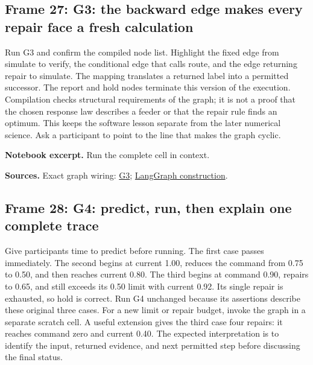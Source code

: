 \documentclass[11pt]{article}
\begin{document}
\subsection*{Frame 27: G3: the backward edge makes every repair face a fresh calculation}
Run G3 and confirm the compiled node list. Highlight the fixed edge from simulate to verify, the conditional edge that calls route, and the edge returning repair to simulate. The mapping translates a returned label into a permitted successor. The report and hold nodes terminate this version of the execution. Compilation checks structural requirements of the graph; it is not a proof that the chosen response law describes a feeder or that the repair rule finds an optimum. This keeps the software lesson separate from the later numerical science. Ask a participant to point to the line that makes the graph cyclic.\par
\par\noindent\begin{minipage}{\linewidth}\textbf{Notebook excerpt.} Run the complete cell in context.\par \end{minipage}\par
\par\nopagebreak\begin{minipage}{\linewidth}{\footnotesize\color{slate}\textbf{Sources.} Exact graph wiring: \href{../Graph_Workflow_Lab.ipynb}{G3}; \href{https://docs.langchain.com/oss/python/langgraph/use-graph-api}{LangGraph construction}.\par}\end{minipage}\par\medskip
\subsection*{Frame 28: G4: predict, run, then explain one complete trace}
Give participants time to predict before running. The first case passes immediately. The second begins at current 1.00, reduces the command from 0.75 to 0.50, and then reaches current 0.80. The third begins at command 0.90, repairs to 0.65, and still exceeds its 0.50 limit with current 0.92. Its single repair is exhausted, so hold is correct. Run G4 unchanged because its assertions describe these original three cases. For a new limit or repair budget, invoke the graph in a separate scratch cell. A useful extension gives the third case four repairs: it reaches command zero and current 0.40. The expected interpretation is to identify the input, returned evidence, and next permitted step before discussing the final status.\par
\end{document}
